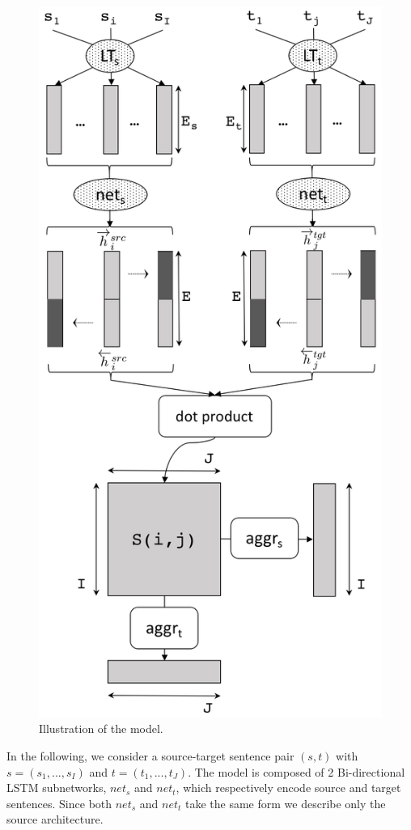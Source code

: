 \documentclass[11pt,a4paper]{article}
\begin{document}
\begin{figure}[h]
\center
    \includegraphics[width=0.8\linewidth]{network}
    \caption{Illustration of the model.} 
    \label{network}
\end{figure}
 

In the following, we consider a source-target sentence pair $(s,t)$ with $s=(s_1,...,s_I)$ and $t=(t_1,...,t_J)$. 
The model is composed of 2 Bi-directional LSTM subnetworks, $net_s$ and $net_t$, which respectively encode source and target sentences. 
Since both $net_s$ and $net_t$ take the same form we describe only the source architecture.
\end{document}

